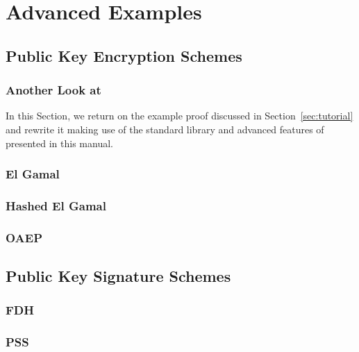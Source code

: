 
\chapter{Advanced Examples}

\section{Public Key Encryption Schemes}
\subsection{Another Look at \citet{br93}}
In this Section, we return on the example proof discussed in
Section~\ref{sec:tutorial} and rewrite it making use of the standard library and
advanced features of \EasyCrypt presented in this manual.

\subsection{El Gamal}

\subsection{Hashed El Gamal}

\subsection{OAEP}

\section{Public Key Signature Schemes}
\subsection{FDH}
\subsection{PSS}

